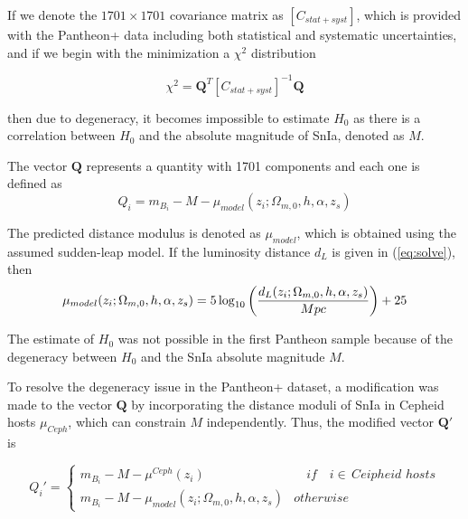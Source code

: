 \documentclass[universe,article,accept,moreauthors,pdftex]{Definitions/mdpi}
\begin{document}
 
 

 
 If we denote the $1701\times 1701$ covariance matrix as $[C_{stat+syst}]$, which is provided with the Pantheon+ data including both statistical and
systematic uncertainties, and if we begin with the minimization a $\chi^2$ distribution

\begin{equation}
    \chi^{2}=\textbf{Q}^{T} [C_{stat+syst}]^{-1}\textbf{Q}
\end{equation}

then due to degeneracy, it becomes impossible to estimate $H_0$ as there is a correlation between $H_0$ and the absolute magnitude of SnIa, denoted as $M$. 



  






The vector $\textbf{Q}$ represents a quantity with 1701 components
and each one is  defined as
\begin{equation}
    Q_{i}=m_{B_{i}}-M-\mu_{model}(z_{i};\Omega_{m,0},h,\alpha,z_{s})
\end{equation}







The predicted distance modulus is denoted as $\mu_{model}$, which is obtained using the assumed sudden-leap model. If the luminosity distance $d_{L}$ is given in  (\ref{eq:solve}), then
 \begin{equation}\mu_{model}(z_{i};\Omega_{m,0},h,\alpha,z_{s})=5\log_{10}\bigg{(}\frac{d_{L}(z_{i};\Omega_{m,0},h,\alpha,z_{s})}{Mpc}\bigg{)}+25\end{equation} 
 

The estimate of $H_0$ was not possible in the first Pantheon sample \cite{Pan-STARRS1:2017jku} because of the degeneracy between $H_0$
and the SnIa absolute magnitude $M$. 

To resolve the degeneracy issue in the Pantheon+ dataset, a modification was made to the vector $\textbf{Q}$ by incorporating the distance moduli of SnIa in Cepheid hosts $\mu_{Ceph}$, which can constrain $M$ independently. Thus, the modified
vector $\textbf{Q}'$ is \cite{Brout:2022vxf}


 

\begin{equation} 
 Q_{i}' =
  \begin{cases}
    m_{B_{i}}-M-\mu^{Ceph}(z_{i})    & \quad if\quad i\in\, Ceipheid\,\, hosts \\
     
    m_{B_{i}}-M-\mu_{model}(z_{i};\Omega_{m,0},h,\alpha,z_{s}) & otherwise
  \end{cases}
  \end{equation}
 
\end{document}
